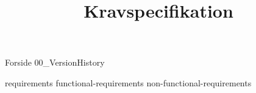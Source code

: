 \documentclass[a4paper,openany]{memoir}
\title{Kravspecifikation}
\begin{document}
	{Forside}  \newpage
	\tableofcontents\thispagestyle{fancy}
	{00_VersionHistory}  \newpage

	{requirements}  \newpage
	{functional-requirements}  \newpage
	{non-functional-requirements}  \newpage

	 {}
	\printbibliography
\end{document}
